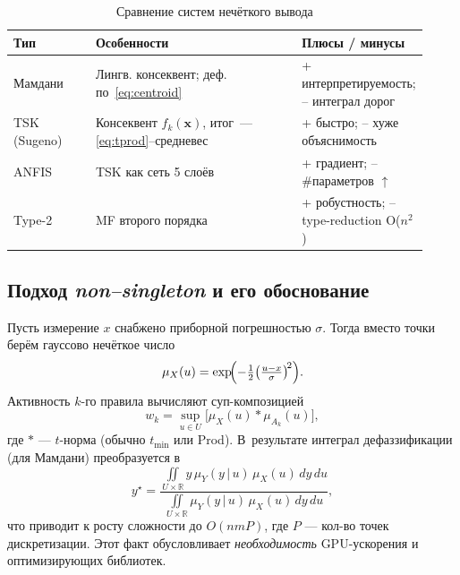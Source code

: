 \begin{table}[h]
\centering\small
\caption{Сравнение систем нечёткого вывода}
\label{tab:sys_comp}
\begin{tabular}{@{}p{0.21\linewidth}p{0.57\linewidth}p{0.14\linewidth}@{}}
\toprule
\textbf{Тип} & \textbf{Особенности} & \textbf{Плюсы / минусы} \\ \midrule
Мамдани & Лингв. консеквент; деф.\,по~\eqref{eq:centroid} &
          + интерпретируемость; – интеграл дорог \\[2pt]
TSK (Sugeno) & Консеквент $f_k(\mathbf x)$, итог~— \eqref{eq:tprod}–средневес & + быстро; – хуже объяснимость \\[2pt]
ANFIS & TSK как сеть 5 слоёв & + градиент; – \#параметров $\uparrow$ \\[2pt]
Type-2 & MF второго порядка & + робустность; – type-reduction O($n^2$) \\
\bottomrule
\end{tabular}
\end{table}

\subsection{Подход \emph{non–singleton} и его обоснование}
\label{subsec:nsi_deep}

Пусть измерение $x$ снабжено приборной погрешностью $\sigma$.
Тогда вместо точки берём гауссово нечёткое число
\begin{equation}
  \mu_{X}(u)=\exp\!\Bigl(
    -\tfrac12\bigl(\tfrac{u-x}{\sigma}\bigr)^{\!2}\Bigr).
  \label{eq:gauss_nsi}
\end{equation}
Активность $k$-го правила вычисляют суп-композицией
\begin{equation}
  w_k=\sup_{u\in U}
      \bigl[\mu_{X}(u)\,\boldsymbol{\ast}\,
            \mu_{A_k}(u)\bigr],
  \label{eq:nsi_sup}
\end{equation}
где $\boldsymbol{\ast}$ — $t$-норма (обычно $t_{\min}$ или Prod).
В~результате интеграл дефаззификации (для Мамдани) преобразуется в
\begin{equation}
  y^\star=\frac{\displaystyle
      \iint\limits_{U\times\mathbb R}
      y\,
      \mu_Y(y\,|\,u)\,
      \mu_{X}(u)\,dy\,du}
    {\displaystyle
      \iint\limits_{U\times\mathbb R}
      \mu_Y(y\,|\,u)\,
      \mu_{X}(u)\,dy\,du},
  \label{eq:nsi_defuzz}
\end{equation}
что приводит к росту сложности до $O(nmP)$, где $P$ —
кол-во точек дискретизации. Этот факт обусловливает
\emph{необходимость} GPU-ускорения и оптимизирующих библиотек.

